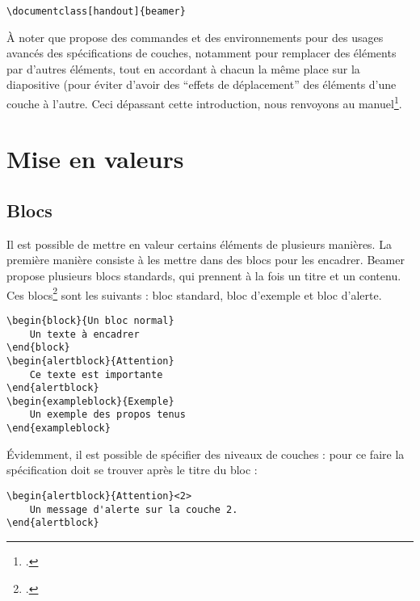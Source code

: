 \begin{verbatim}
\documentclass[handout]{beamer}
\end{verbatim}

À noter que  propose des commandes et des environnements pour des usages avancés des spécifications de couches, notamment pour remplacer des éléments par d'autres éléments, tout en accordant à chacun la même place sur la diapositive (pour éviter d'avoir des \enquote{effets de déplacement} des éléments d'une couche à l'autre. 
Ceci dépassant cette introduction, nous renvoyons au manuel\footcite{beamer_overlays}.
\section{Mise en valeurs}

\subsection{Blocs}

Il est possible de mettre en valeur certains éléments de plusieurs manières. La première manière consiste à les mettre dans des blocs pour les encadrer. Beamer propose plusieurs blocs standards, qui prennent à la fois un titre et un contenu. Ces blocs\footcites[Il est possible de créer ses propres blocs, voir : ][]{beamer_box}[il existe aussi des éléments proches des blocs que sont les encadrés, pour mettre en valeur des définitions, des théorèmes, ][]{beamer_theorems} sont les suivants : bloc standard, bloc d'exemple et bloc d'alerte.

\begin{verbatim}
\begin{block}{Un bloc normal} 
	Un texte à encadrer
\end{block}
\begin{alertblock}{Attention} 
	Ce texte est importante
\end{alertblock}
\begin{exampleblock}{Exemple} 
	Un exemple des propos tenus
\end{exampleblock}
\end{verbatim}

Évidemment, il est possible de spécifier des niveaux de couches : pour ce faire la spécification doit se trouver après le titre du bloc :

\begin{verbatim}
\begin{alertblock}{Attention}<2>
	Un message d'alerte sur la couche 2.
\end{alertblock}
\end{verbatim}


